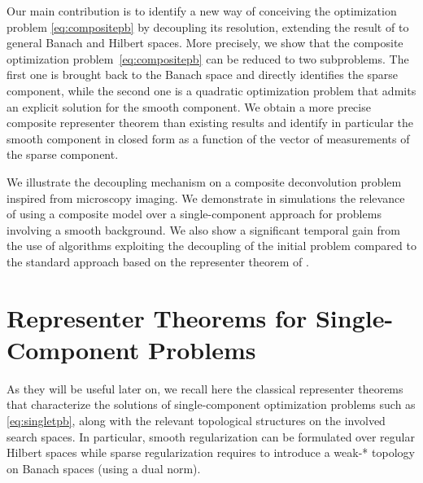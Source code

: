 \documentclass[12pt]{article}
\begin{document}
    Our main contribution is to identify a new way of conceiving the optimization problem \eqref{eq:compositepb} by decoupling its resolution, extending the result of \cite{jarret2024decoupled} to general Banach and Hilbert spaces. More precisely, we show that the composite optimization problem~\eqref{eq:compositepb} can be reduced to two subproblems. The first one is brought back to the Banach space and directly identifies the sparse component, while the second one is a quadratic optimization problem that admits an explicit solution for the smooth component. We obtain a more precise composite representer theorem than existing results and identify in particular the smooth component in closed form as a function of the vector of measurements of the sparse component.


    We illustrate the decoupling mechanism on a composite deconvolution problem inspired from microscopy imaging.
    We demonstrate in simulations the relevance of using a composite model over a single-component approach for problems involving a smooth background. We also show a significant temporal gain from the use of algorithms exploiting the decoupling of the initial problem compared to the standard approach based on the representer theorem of \cite{debarre2021continuous}. 




\section{Representer Theorems for Single-Component Problems}

    As they will be useful later on, we recall here the classical representer theorems that characterize the solutions of single-component optimization problems such as \eqref{eq:singletpb}, along with the relevant topological structures on the involved search spaces. In particular, smooth regularization can be formulated over regular Hilbert spaces while
    sparse regularization requires to introduce a weak-* topology on Banach spaces (using a dual norm).
\end{document}
